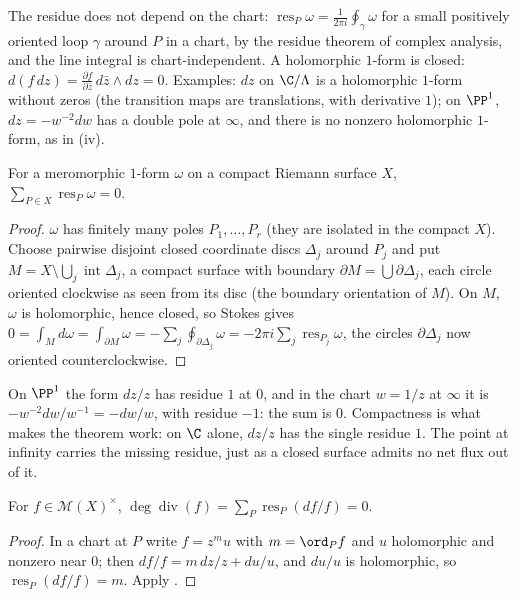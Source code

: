 The residue does not depend on the chart: $\operatorname{res}_P\omega=\frac1{2\pi i}\oint_\gamma\omega$ for a small positively oriented loop $\gamma$ around $P$ in a chart, by the
residue theorem of complex analysis, and the line integral is chart-independent. A holomorphic $1$-form is closed: $d(f\,dz)=\frac{\partial f}{\partial\bar z}\,d\bar z\wedge dz=0$.
Examples: $dz$ on $\C/\Lambda$ is a holomorphic $1$-form without zeros (the transition maps are translations, with derivative $1$); on $\PP^1$, $dz=-w^{-2}dw$ has a double
pole at $\infty$, and there is no nonzero holomorphic $1$-form, as in (iv).

\begin{theorem}\label{thm:curves:residue}
For a meromorphic $1$-form $\omega$ on a compact Riemann surface $X$, $\sum_{P\in X}\operatorname{res}_P\omega=0$.
\end{theorem}

\begin{proof}
$\omega$ has finitely many poles $P_1,\dots,P_r$ (they are isolated in the compact $X$). Choose pairwise disjoint closed coordinate discs $\Delta_j$ around $P_j$ and put
$M=X\setminus\bigcup_j\operatorname{int}\Delta_j$, a compact surface with boundary $\partial M=\bigcup\partial\Delta_j$, each circle oriented clockwise as seen from its disc (the
boundary orientation of $M$). On $M$, $\omega$ is holomorphic, hence closed, so Stokes gives $0=\int_Md\omega=\int_{\partial M}\omega=-\sum_j\oint_{\partial\Delta_j}\omega=-2\pi i\sum_j\operatorname{res}_{P_j}\omega$,
the circles $\partial\Delta_j$ now oriented counterclockwise.
\end{proof}

On $\PP^1$ the form $dz/z$ has residue $1$ at $0$, and in the chart $w=1/z$ at $\infty$ it is $-w^{-2}dw/w^{-1}=-dw/w$, with residue $-1$: the sum is $0$. Compactness is
what makes the theorem work: on $\C$ alone, $dz/z$ has the single residue $1$. The point at infinity carries the missing residue, just as a closed surface
admits no net flux out of it.

\begin{corollary}\label{cor:curves:argument-principle}
For $f\in\mathcal M(X)^\times$, $\deg\operatorname{div}(f)=\sum_P\operatorname{res}_P(df/f)=0$.
\end{corollary}

\begin{proof}
In a chart at $P$ write $f=z^mu$ with $m=\ord_Pf$ and $u$ holomorphic and nonzero near $0$; then $df/f=m\,dz/z+du/u$, and $du/u$ is holomorphic, so
$\operatorname{res}_P(df/f)=m$. Apply .
\end{proof}

